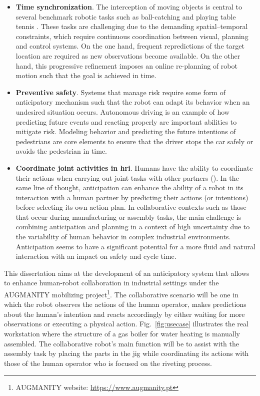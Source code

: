 \begin{itemize}

\item \textbf{Time synchronization}. The interception of moving objects is central to several benchmark robotic tasks such as ball-catching and playing table tennis \cite{Carneiro2021, Wang2017}. These tasks are challenging due to the demanding spatial–temporal constraints, which require continuous coordination between visual, planning and control systems. On the one hand, frequent repredictions of the target location are required as new observations become available. On the other hand, this progressive refinement imposes an online re-planning of robot motion such that the goal is achieved in time.

\item \textbf{Preventive safety}. Systems that manage risk require some form of anticipatory mechanism such that the robot can adapt its behavior when an undesired situation occurs. Autonomous driving is an example of how predicting future events and reacting properly are important abilities to mitigate risk. Modeling behavior and predicting the future intentions of pedestrians are core elements to ensure that the driver stops the car safely or avoids the pedestrian in time.

\item \textbf{Coordinate joint activities in \acf{hri}}. Humans have the ability to coordinate their actions when carrying out joint tasks with other partners (\textcite{Sebanz2006,Hoffman2007}). In the same line of thought, anticipation can enhance the ability of a robot in its interaction with a human partner by predicting their actions (or intentions) before selecting its own action plan. In collaborative contexts such as those that occur during manufacturing or assembly tasks, the main challenge is combining anticipation and planning in a context of high uncertainty due to the variability of human behavior in complex industrial environments. Anticipation seems to have a significant potential for a more fluid and natural interaction with an impact on safety and cycle time.

\end{itemize}

This dissertation aims at the development of an anticipatory system that allows to enhance human-robot collaboration in industrial settings under the AUGMANITY mobilizing project\footnote{AUGMANITY website: \url{https://www.augmanity.pt}}. The collaborative scenario will be one in which the robot observes the actions of the human operator, makes predictions about the human’s intention and reacts accordingly by either waiting for more observations or executing a physical action. Fig.~\ref{fig:usecase} illustrates the real workstation where the structure of a gas boiler for water heating is manually assembled. The collaborative robot’s main function will be to assist with the assembly task by placing the parts in the jig while coordinating its actions with those of the human
operator who is focused on the riveting process. 

